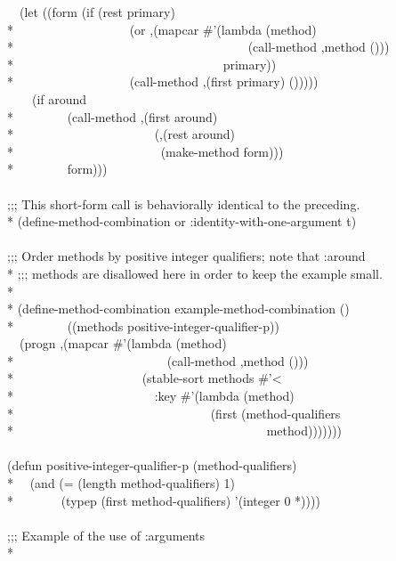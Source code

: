 \begin{defmac}
\begin{lisp}
~~(let ((form (if (rest primary) \\*
~~~~~~~~~~~~~~~~~~{\Xbq}(or ,{\Xatsign}(mapcar \#'(lambda (method) \\*
~~~~~~~~~~~~~~~~~~~~~~~~~~~~~~~~~~~~~{\Xbq}(call-method ,method ())) \\*
~~~~~~~~~~~~~~~~~~~~~~~~~~~~~~~~~primary)) \\*
~~~~~~~~~~~~~~~~~~{\Xbq}(call-method ,(first primary) ())))) \\
~~~~(if around \\*
~~~~~~~~{\Xbq}(call-method ,(first around) \\*
~~~~~~~~~~~~~~~~~~~~~~(,{\Xatsign}(rest around) \\*
~~~~~~~~~~~~~~~~~~~~~~~(make-method form))) \\*
~~~~~~~~form))) \\
\\
;;; This short-form call is behaviorally identical to the preceding. \\*
(define-method-combination or :identity-with-one-argument t) \\
 \\
;;; Order methods by positive integer qualifiers; note that :around \\*
;;; methods are disallowed here in order to keep the example small. \\*
\\*
(define-method-combination example-method-combination () \\*
~~~~~~~~((methods positive-integer-qualifier-p)) \\
~~{\Xbq}(progn ,{\Xatsign}(mapcar \#'(lambda (method) \\*
~~~~~~~~~~~~~~~~~~~~~~~~{\Xbq}(call-method ,method ())) \\*
~~~~~~~~~~~~~~~~~~~~(stable-sort methods \#'< \\*
~~~~~~~~~~~~~~~~~~~~~~:key \#'(lambda (method) \\*
~~~~~~~~~~~~~~~~~~~~~~~~~~~~~~~(first (method-qualifiers \\*
~~~~~~~~~~~~~~~~~~~~~~~~~~~~~~~~~~~~~~~~method))))))) \\
\\
(defun positive-integer-qualifier-p (method-qualifiers) \\*
~~(and (= (length method-qualifiers) 1) \\*
~~~~~~~(typep (first method-qualifiers) '(integer 0 *)))) \\
\\
;;; Example of the use of :arguments \\*

\end{lisp}
\end{defmac}
